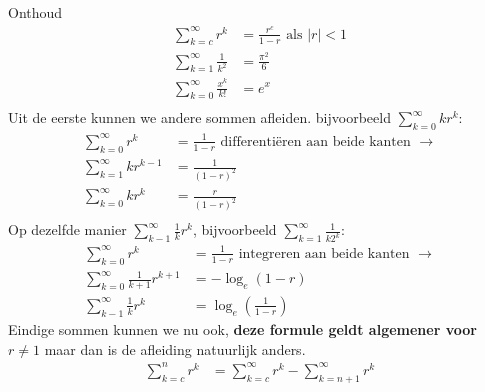 Onthoud
\begin{align*}
    \sum_{k=c}^{\infty} r^k &= \frac{r^c}{1-r} \text{ als $|r|<1$}\\
    \sum_{k=1}^{\infty} \frac{1}{k^2} &= \frac{\pi^2}{6} \\
    \sum_{k=0}^\infty \frac{x^k}{k!} &= e^x \\
\end{align*}
Uit de eerste kunnen we andere sommen afleiden.
bijvoorbeeld
$\displaystyle \sum_{k=0}^{\infty} kr^k: $
\begin{align*}
    \sum_{k=0}^{\infty} r^k &= \frac{1}{1-r} \text { differenti\"eren aan beide kanten } \to \\
    \sum_{k=1}^{\infty} kr^{k-1} &= \frac{1}{(1-r)^2} \\
    \sum_{k=0}^{\infty} kr^k &= \frac{r}{(1-r)^2} \\
\end{align*}
Op dezelfde manier $\displaystyle \sum_{k-1}^\infty \frac{1}{k} r^k$, bijvoorbeeld $\displaystyle \sum_{k=1}^{\infty} \frac{1}{k2^k}$:
\begin{align*}
    \sum_{k=0}^{\infty} r^k &= \frac{1}{1-r} \text { integreren aan beide kanten } \to \\
    \sum_{k=0}^{\infty} \frac{1}{k+1} r^{k+1} &= -\log_e (1-r) \\
    \sum_{k-1}^\infty \frac{1}{k} r^k &= \log_e (\frac{1}{1-r})
\end{align*}
Eindige sommen kunnen we nu ook, \textbf{deze formule geldt algemener voor $r\neq 1$} maar dan is de afleiding natuurlijk anders.
\begin{align*}
    \sum_{k=c}^n r^k &= \sum_{k=c}^\infty r^k - \sum_{k=n+1}^\infty r^k
\end{align*}